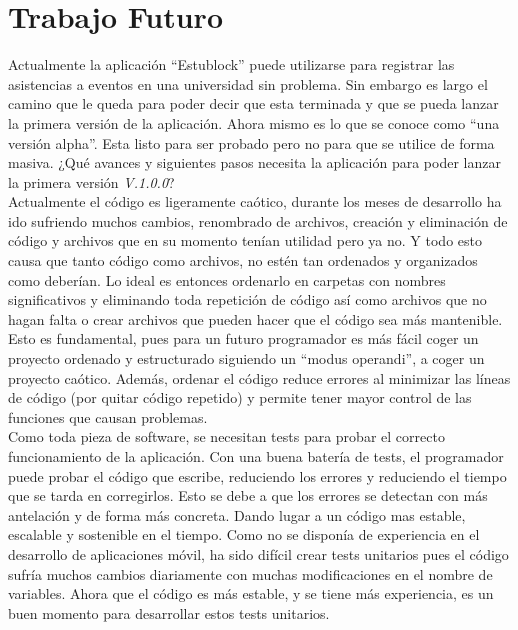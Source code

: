 \chapter{Trabajo Futuro}
\label{cap:Futuro}

Actualmente la aplicación ``Estublock'' puede utilizarse para registrar las asistencias a eventos en una universidad sin problema. Sin embargo es largo el camino que le queda para poder decir que esta terminada y que se pueda lanzar la primera versión de la aplicación. Ahora mismo es lo que se conoce como ``una versión alpha''. Esta listo para ser probado pero no para que se utilice de forma masiva. ¿Qué avances y siguientes pasos necesita la aplicación para poder lanzar la primera versión \emph{V.1.0.0}? \\

Actualmente el código es ligeramente caótico, durante los meses de desarrollo ha ido sufriendo muchos cambios, renombrado de archivos, creación y eliminación de código y archivos que en su momento tenían utilidad pero ya no. Y todo esto causa que tanto código como archivos, no estén tan ordenados y organizados como deberían. Lo ideal es entonces ordenarlo en carpetas con nombres significativos y eliminando toda repetición de código así como archivos que no hagan falta o crear archivos que pueden hacer que el código sea más mantenible. Esto es fundamental, pues para un futuro programador es más fácil coger un proyecto ordenado y estructurado siguiendo un ``modus operandi'', a coger un proyecto caótico. Además, ordenar el código reduce errores al minimizar las líneas de código (por quitar código repetido) y permite tener mayor control de las funciones que causan problemas. \\
 
Como toda pieza de software, se necesitan tests para probar el correcto funcionamiento de la aplicación. Con una buena batería de tests, el programador puede probar el código que escribe, reduciendo los errores y reduciendo el tiempo que se tarda en corregirlos. Esto se debe a que los errores se detectan con más antelación y de forma más concreta. Dando lugar a un código mas estable, escalable y sostenible en el tiempo. Como no se disponía de experiencia en el desarrollo de aplicaciones móvil, ha sido difícil crear tests unitarios pues el código sufría muchos cambios diariamente con muchas modificaciones en el nombre de variables. Ahora que el código es más estable, y se tiene más experiencia, es un buen momento para desarrollar estos tests unitarios. \\

